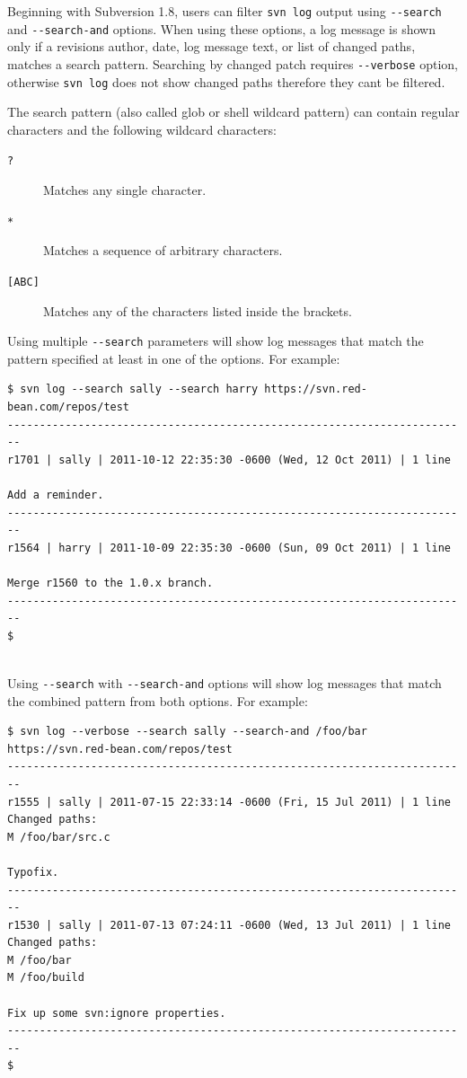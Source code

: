 Beginning with Subversion 1.8, users can filter \texttt{svn\ log} output
using \texttt{-\/-search} and \texttt{-\/-search-and} options. When
using these options, a log message is shown only if a
revision\textquotesingle s author, date, log message text, or list of
changed paths, matches a search pattern. Searching by changed patch
requires \texttt{-\/-verbose} option, otherwise \texttt{svn\ log} does
not show changed paths therefore they can\textquotesingle t be filtered.

The search pattern (also called glob or shell wildcard pattern) can
contain regular characters and the following wildcard characters:

\begin{description}
\item[\texttt{?}]
Matches any single character.
\item[\texttt{*}]
Matches a sequence of arbitrary characters.
\item[\texttt{{[}ABC{]}}]
Matches any of the characters listed inside the brackets.
\end{description}

Using multiple \texttt{-\/-search} parameters will show log messages
that match the pattern specified at least in one of the options. For
example:

\begin{verbatim}
$ svn log --search sally --search harry https://svn.red-bean.com/repos/test
------------------------------------------------------------------------
r1701 | sally | 2011-10-12 22:35:30 -0600 (Wed, 12 Oct 2011) | 1 line

Add a reminder.
------------------------------------------------------------------------
r1564 | harry | 2011-10-09 22:35:30 -0600 (Sun, 09 Oct 2011) | 1 line

Merge r1560 to the 1.0.x branch.
------------------------------------------------------------------------
$
        
\end{verbatim}

Using \texttt{-\/-search} with \texttt{-\/-search-and} options will show
log messages that match the combined pattern from both options. For
example:

\begin{verbatim}
$ svn log --verbose --search sally --search-and /foo/bar https://svn.red-bean.com/repos/test
------------------------------------------------------------------------
r1555 | sally | 2011-07-15 22:33:14 -0600 (Fri, 15 Jul 2011) | 1 line
Changed paths:
M /foo/bar/src.c

Typofix.
------------------------------------------------------------------------
r1530 | sally | 2011-07-13 07:24:11 -0600 (Wed, 13 Jul 2011) | 1 line
Changed paths:
M /foo/bar
M /foo/build

Fix up some svn:ignore properties.
------------------------------------------------------------------------
$
\end{verbatim}

